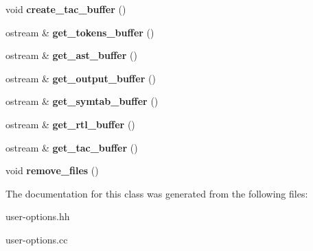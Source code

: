 \begin{DoxyCompactItemize}
\item 
\mbox{\label{classUser__Options_ac7565a31fc7cef2152b6d94a85680970}} 
void {\bfseries create\+\_\+tac\+\_\+buffer} ()
\item 
\mbox{\label{classUser__Options_aaec479d73f2b0ff5c926c19f17597222}} 
ostream \& {\bfseries get\+\_\+tokens\+\_\+buffer} ()
\item 
\mbox{\label{classUser__Options_a00c6af106872495afef07454f22b4ca0}} 
ostream \& {\bfseries get\+\_\+ast\+\_\+buffer} ()
\item 
\mbox{\label{classUser__Options_a26e99a0ae99ada6ac9f5a6fc60566e1e}} 
ostream \& {\bfseries get\+\_\+output\+\_\+buffer} ()
\item 
\mbox{\label{classUser__Options_a46465691954eb16635f3834feedc1ff9}} 
ostream \& {\bfseries get\+\_\+symtab\+\_\+buffer} ()
\item 
\mbox{\label{classUser__Options_a274e4f4dea512b418e0910b4ca12487d}} 
ostream \& {\bfseries get\+\_\+rtl\+\_\+buffer} ()
\item 
\mbox{\label{classUser__Options_ac8888cd4fe4eeda4e9fd80efe1e2dcf4}} 
ostream \& {\bfseries get\+\_\+tac\+\_\+buffer} ()
\item 
\mbox{\label{classUser__Options_af8dbd54a1350a936fe8cf48ede86eb46}} 
void {\bfseries remove\+\_\+files} ()
\end{DoxyCompactItemize}


The documentation for this class was generated from the following files\+:\begin{DoxyCompactItemize}
\item 
user-\/options.\+hh\item 
user-\/options.\+cc\end{DoxyCompactItemize}
